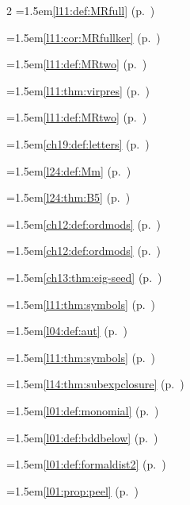 \begin{multicols}{2}
\hangindent=1.5em\quad \ref{l11:def:MRfull} (p.~\pageref{l11:def:MRfull})\par
\hangindent=1.5em\quad \ref{l11:cor:MRfullker} (p.~\pageref{l11:cor:MRfullker})\par
\hangindent=1.5em\quad \ref{l11:def:MRtwo} (p.~\pageref{l11:def:MRtwo})\par
\hangindent=1.5em\quad \ref{l11:thm:virpres} (p.~\pageref{l11:thm:virpres})\par
\hangindent=1.5em\quad \ref{l11:def:MRtwo} (p.~\pageref{l11:def:MRtwo})\par
\hangindent=1.5em\quad \ref{ch19:def:letters} (p.~\pageref{ch19:def:letters})\par
\hangindent=1.5em\quad \ref{l24:def:Mm} (p.~\pageref{l24:def:Mm})\par
\hangindent=1.5em\quad \ref{l24:thm:B5} (p.~\pageref{l24:thm:B5})\par
\hangindent=1.5em\quad \ref{ch12:def:ordmods} (p.~\pageref{ch12:def:ordmods})\par
\hangindent=1.5em\quad \ref{ch12:def:ordmods} (p.~\pageref{ch12:def:ordmods})\par
\hangindent=1.5em\quad \ref{ch13:thm:eig-seed} (p.~\pageref{ch13:thm:eig-seed})\par
\hangindent=1.5em\quad \ref{l11:thm:symbols} (p.~\pageref{l11:thm:symbols})\par
\hangindent=1.5em\quad \ref{l04:def:aut} (p.~\pageref{l04:def:aut})\par
\hangindent=1.5em\quad \ref{l11:thm:symbols} (p.~\pageref{l11:thm:symbols})\par
\hangindent=1.5em\quad \ref{l14:thm:subexpclosure} (p.~\pageref{l14:thm:subexpclosure})\par
\hangindent=1.5em\quad \ref{l01:def:monomial} (p.~\pageref{l01:def:monomial})\par
\hangindent=1.5em\quad \ref{l01:def:bddbelow} (p.~\pageref{l01:def:bddbelow})\par
\hangindent=1.5em\quad \ref{l01:def:formaldist2} (p.~\pageref{l01:def:formaldist2})\par
\hangindent=1.5em\quad \ref{l01:prop:peel} (p.~\pageref{l01:prop:peel})\par

\end{multicols}
